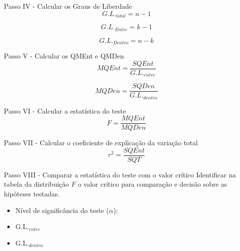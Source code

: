 \documentclass{bredelebeamer}
\begin{document}
\begin{frame}
\begin{block}{Passo IV - Calcular os Graus de Liberdade}
\[
G.L._{total} = n - 1
\]

\[
G.L._{Entre} = k - 1
\]

\[
G.L._{Dentro} = n - k
\]
\end{block}

\pause
\begin{block}{Passo V - Calcular os QMEnt e QMDen}
\[
MQEnt = \frac{SQEnt}{G.L._{entre}}
\]

\[
MQDen = \frac{SQDen}{G.L._{dentro}}
\]
\end{block}
\end{frame}

\begin{frame}
\begin{block}{Passo VI - Calcular a estatística do teste}
\[
F = \frac{MQEnt}{MQDen}
\]
\end{block}

\pause
\begin{block}{Passo VII - Calcular o coeficiente de explicação da
    variação total}
\[
r^{2} = \frac{SQEnt}{SQT}
\]
\end{block}

\pause
\begin{block}{Passo VIII - Comparar a estatística do teste com o valor
    crítico} 
Identificar na tabela da distribuição $F$ o valor crítico para
comparação e decisão sobre as hipóteses testadas.

\vspace{.2cm}

\begin{itemize}
\item Nível de significância do teste ($\alpha$);
\item G.L.$_{entre}$
\item G.L.$_{dentro}$
\end{itemize}
\end{block}
\end{frame}
\end{document}
